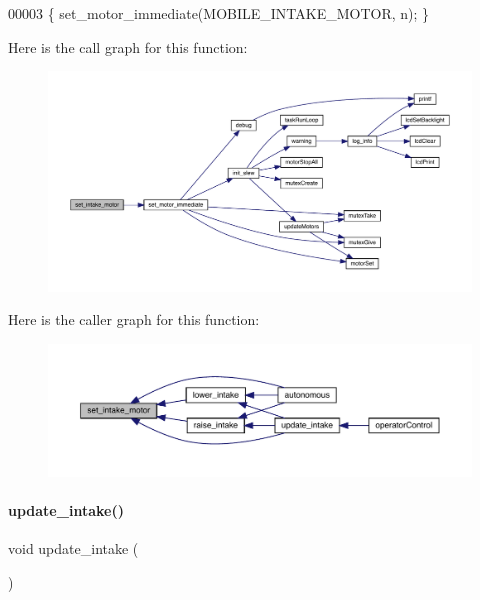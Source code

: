 \begin{DoxyCode}
00003 \{ set_motor_immediate(MOBILE\_INTAKE\_MOTOR, n); \}
\end{DoxyCode}
Here is the call graph for this function\+:
\nopagebreak
\begin{figure}[H]
\begin{center}
\leavevmode
\includegraphics[width=350pt]{mobile__goal__intake_8h_ab31e12bb0fa46c77906a048666b699d5_cgraph}
\end{center}
\end{figure}
Here is the caller graph for this function\+:
\nopagebreak
\begin{figure}[H]
\begin{center}
\leavevmode
\includegraphics[width=350pt]{mobile__goal__intake_8h_ab31e12bb0fa46c77906a048666b699d5_icgraph}
\end{center}
\end{figure}
\mbox{\label{mobile__goal__intake_8h_a5d7bad8a208988af743fd2e68f111286}} 
\paragraph{update\+\_\+intake()}
{\footnotesize\ttfamily void update\+\_\+intake (\begin{DoxyParamCaption}{ }\end{DoxyParamCaption})}



